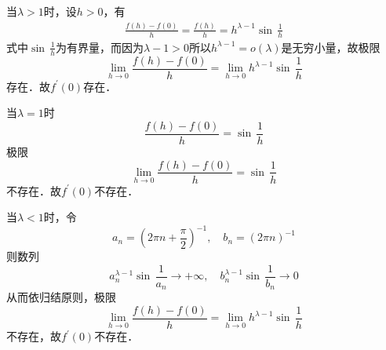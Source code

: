 \prove 当$\lambda > 1$时，设$h > 0$，有
\begin{align}
    \frac{f(h)-f(0)}{h} = \frac{f(h)}{h} = h^{\lambda-1} \sin \, \frac{1}{h}
\end{align}
式中$\sin \, \frac{1}{h}$为有界量，而因为$\lambda-1>0$所以$h^{\lambda-1}=o(\lambda)$是无穷小量，故极限
\begin{equation}
    \lim_{h \to 0} \frac{f(h)-f(0)}{h} = \lim_{h \to 0} h^{\lambda - 1} \sin \, \frac{1}{h}
\end{equation}
存在．故$f^{\prime}(0)$存在．

当$\lambda = 1$时
\begin{equation}
    \frac{f(h)-f(0)}{h} = \sin \, \frac{1}{h}
\end{equation}
极限
\begin{equation}
    \lim_{h \to 0} \frac{f(h)-f(0)}{h} = \sin \, \frac{1}{h}
\end{equation}
不存在．故$f^{\prime}(0)$不存在．


当$\lambda < 1$时，令
\begin{equation}
    a_n = \left(2\pi n + \frac{\pi}{2}\right)^{-1}, \quad b_n = \left(2 \pi n\right)^{-1}
\end{equation}
则数列
\begin{equation}
    a_n^{\lambda-1} \sin \, \frac{1}{a_n} \to +\infty, \quad b_n^{\lambda - 1} \sin \, \frac{1}{b_n} \to 0
\end{equation}
从而依归结原则，极限
\begin{equation}
    \lim_{h \to 0} \frac{f(h)-f(0)}{h} = \lim_{h \to 0} h^{\lambda - 1} \sin \, \frac{1}{h}
\end{equation}
不存在，故$f^{\prime}(0)$不存在．